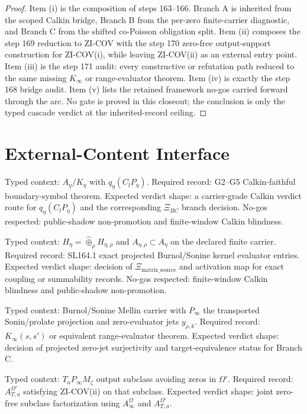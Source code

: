 \documentclass[11pt]{article}
\begin{document}
\begin{proof}
Item (i) is the composition of steps 163--166. Branch A is inherited from the scoped Calkin bridge, Branch B from the per-zero finite-carrier diagnostic, and Branch C from the shifted co-Poisson obligation split. Item (ii) composes the step 169 reduction to ZI-COV with the step 170 zero-free output-support construction for ZI-COV(i), while leaving ZI-COV(ii) as an external entry point. Item (iii) is the step 171 audit: every constructive or refutation path reduced to the same missing \(K_\infty\) or range-evaluator theorem. Item (iv) is exactly the step 168 bridge audit. Item (v) lists the retained framework no-gos carried forward through the arc. No gate is proved in this closeout; the conclusion is only the typed cascade verdict at the inherited-record ceiling.
\end{proof}

\section{External-Content Interface}

\begin{description}[leftmargin=0.2in,style=nextline]
\item[Branch A.]
Typed context: \(A_\eta/K_\eta\) with \(q_\eta(C_lP_\eta)\). Required record: G2--G5 Calkin-faithful boundary-symbol theorem. Expected verdict shape: a carrier-grade Calkin verdict route for \(q_\eta(C_lP_\eta)\) and the corresponding \(\Xi_{BC}\) branch decision. No-gos respected: public-shadow non-promotion and finite-window Calkin blindness.

\item[Branch B.]
Typed context: \(H_\eta=\widehat{\oplus}_\rho H_{\eta,\rho}\) and \(A_{\eta,\rho}\subset A_\eta\) on the declared finite carrier. Required record: SL164.1 exact projected Burnol/Sonine kernel evaluator entries. Expected verdict shape: decision of \(\Xi_{\mathrm{matrix\_source}}\) and activation map for exact coupling or summability records. No-gos respected: finite-window Calkin blindness and public-shadow non-promotion.

\item[Branch C-K.]
Typed context: Burnol/Sonine Mellin carrier with \(P_\infty\) the transported Sonin/prolate projection and zero-evaluator jets \(y_{\rho,k}\). Required record: \(K_\infty(s,s')\) or equivalent range-evaluator theorem. Expected verdict shape: decision of projected zero-jet surjectivity and target-equivalence status for Branch C.

\item[Branch C-II.]
Typed context: \(T_aP_\infty M_\zeta\) output subclass avoiding zeros in \(\Omega'\). Required record: \(A_{T,a}^{\Omega'}\) satisfying ZI-COV(ii) on that subclass. Expected verdict shape: joint zero-free subclass factorization using \(A_\infty^\Omega\) and \(A_{T,a}^{\Omega'}\).
\end{description}
\end{document}
